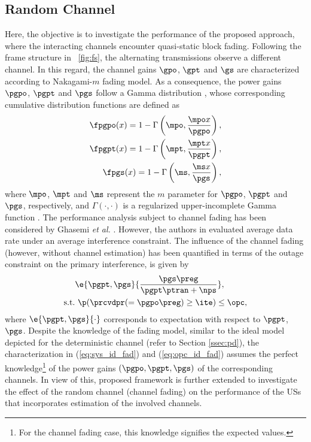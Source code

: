 {\subsection{Random Channel}\label{ssec:ltpa}
Here, the objective is to investigate the performance of the proposed approach, where the interacting channels encounter quasi-static block fading. Following the frame structure in \figurename~\ref{fig:fs}, the alternating transmissions observe a different channel. In this regard, the channel gains $\gpo$, $\gpt$ and $\gs$ are characterized according to Nakagami-$m$ fading model. As a consequence, the power gains $\pgpo$, $\pgpt$ and $\pgs$ follow a Gamma distribution \cite{Goldsmith05}, whose corresponding cumulative distribution functions are defined as  
\begin{align}
\fpgpo(x) = 1 - \Gamma\left(\mpo, \frac{\mpo x}{\pgpo}\right), \label{eq:dis_pgpo}\\
\fpgpt(x) = 1 - \Gamma\left(\mpt, \frac{\mpt x}{\pgpt}\right), \label{eq:dis_pgpt}\\  
\fpgs(x) = 1 - \Gamma\left(\ms , \frac{\ms x}{\pgs}\right), \label{eq:dis_pgs}
\end{align}
where $\mpo$, $\mpt$ and $\ms$ represent the $m$ parameter for $\pgpo$, $\pgpt$ and $\pgs$, respectively, and $\Gamma(\cdot, \cdot)$ is a regularized upper-incomplete Gamma function \cite{abramo}. The performance analysis subject to channel fading has been considered by Ghasemi \textit{et al.} \cite{Ghasemi06, Ghasemi07}. However, the authors in \cite{Ghasemi06, Ghasemi07} evaluated average data rate under an average interference constraint. The influence of the channel fading (however, without channel estimation) has been quantified in terms of the outage constraint on the primary interference, is given by %
\begin{align}
	\quad & \e{\pgpt, \pgs }{ \frac{\pgs \preg}{\pgpt \ptran + \nps}} \label{eq:sys_id_fad}, \\
	\text{s.t.} & \text{ } \p(\prcvdpr(= \pgpo \preg) \ge \ite) \le \opc, \label{eq:opc_id_fad} 
\end{align}
where $\e{\pgpt, \pgs} {\cdot}$ corresponds to expectation with respect to $\pgpt$, $\pgs$.
Despite the knowledge of the fading model, similar to the ideal model depicted for the deterministic channel (refer to Section \ref{ssec:pd}), the characterization in (\ref{eq:sys_id_fad}) and (\ref{eq:opc_id_fad}) assumes the perfect knowledge\footnote{For the channel fading case, this knowledge signifies the expected values.} of the power gains $(\pgpo, \pgpt, \pgs)$ of the corresponding channels. In view of this, proposed framework is further extended to investigate the effect of the random channel (channel fading) on the performance of the USs that incorporates estimation of the involved channels.

}
